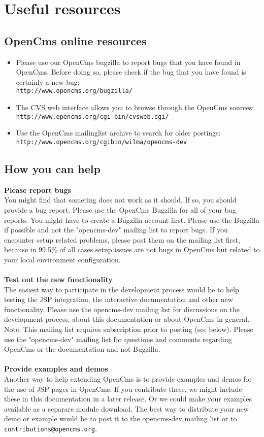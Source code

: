 \chapter{Useful resources}

\section{OpenCms online resources}

\begin{itemize}
\item Please use our OpenCms bugzilla to report bugs that you have found in OpenCms. 
Before doing so, please check if the bug that you have found is certainly a new bug:\\
{\tt http://www.opencms.org/bugzilla/}
\item The CVS web interface allows you to browse through the OpenCms sources:\\
{\tt http://www.opencms.org/cgi-bin/cvsweb.cgi/}
\item Use the OpenCms mailinglist archive to search for older postings:\\
{\tt http://www.opencms.org/cgibin/wilma/opencms-dev}
\end{itemize}

\section{How you can help}
{\bf Please report bugs}\\
You might find that someting does not work as it should. If so, you should provide a bug report. 
Please use the OpenCms Bugzilla for all of your bug reports. You might have to create a Bugzilla 
account first. Please use the Bugzilla if possible and not the "opencms-dev" mailing list to report 
bugs. If you encounter setup related problems, please post them on the mailing list first, because 
in 99.5\% of all cases setup issues are not bugs in OpenCms but related to your local environment
configuration.\\
\\
{\bf Test out the new functionality}\\
The easiest way to participate in the development process would be to help testing the JSP integration, 
the interactive documentation and other new functionality. Please use the opencms-dev mailing list for 
discussions on the development process, about this documentation or about OpenCms in general. Note: This 
mailing list requires subscription prior to posting (see below). Please use the "opencms-dev" mailing list 
for questions and comments regarding OpenCms or the documentation and not Bugzilla.\\
\\
{\bf Provide examples and demos}\\
Another way to help extending OpenCms is to provide examples and demos for the use of JSP pages in OpenCms. 
If you contribute these, we might include these in this documentation in a later release. Or we could make 
your examples available as a separare module download. The best way to distribute your new demo or example 
would be to post it to the opencms-dev mailing list or to {\tt contributions@opencms.org}.


